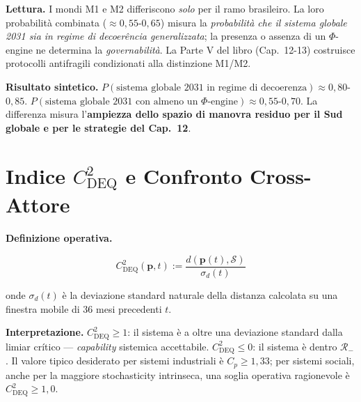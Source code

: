 \Hypoth{} \textbf{Lettura.} I mondi M1 e M2 differiscono \emph{solo} per
il ramo brasileiro. La loro probabilità combinata
(\(\approx 0{,}55\)-\(0{,}65\)) misura la \emph{probabilità che il
sistema globale 2031 sia in regime di decoerência generalizzata}; la
presenza o assenza di un \(\Phi\)-engine ne determina la
\emph{governabilità}. La Parte V del libro (Cap.~12-13) costruisce
protocolli antifragili condizionati alla distinzione M1/M2.

\Proved{} \textbf{Risultato sintetico.}
\(P(\text{sistema globale 2031 in regime di decoerenza}) \approx 0{,}80\)-\(0{,}85\).
\(P(\text{sistema globale 2031 con almeno un $\Phi$-engine}) \approx 0{,}55\)-\(0{,}70\).
La differenza misura l'\textbf{ampiezza dello spazio di manovra residuo
per il Sud globale e per le strategie del Cap.~12}.



\section{\texorpdfstring{Indice \(C_{\text{DEQ}}^2\) e Confronto
Cross-Attore}{Indice C\_\{\textbackslash text\{DEQ\}\}\^{}2 e Confronto Cross-Attore}}\label{indice-c_textdeq2-e-confronto-cross-attore}

\Hypoth{} \textbf{Definizione operativa.}

\[
C_{\text{DEQ}}^2(\boldsymbol{p}, t) := \frac{d(\boldsymbol{p}(t), \mathcal{S})}{\sigma_d(t)}
\]

onde \(\sigma_d(t)\) è la deviazione standard naturale della distanza
calcolata su una finestra mobile di 36 mesi precedenti \(t\).

\Proved{} \textbf{Interpretazione.} \(C_{\text{DEQ}}^2 \geq 1\): il
sistema è a oltre una deviazione standard dalla limiar crítico ---
\emph{capability} sistemica accettabile. \(C_{\text{DEQ}}^2 \leq 0\): il
sistema è dentro \(\mathcal{R}_-\). Il valore tipico desiderato per
sistemi industriali è \(C_p \geq 1{,}33\); per sistemi sociali, anche
per la maggiore stochasticity intrinseca, una soglia operativa
ragionevole è \(C_{\text{DEQ}}^2 \geq 1{,}0\).

